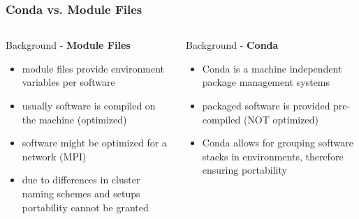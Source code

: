 \begin{frame}
  \frametitle{Conda vs. Module Files}
  \begin{columns}[t]
    \begin{column}{0.5\textwidth}
      Background - \textbf{Module Files}
      \begin{itemize}
       \item module files provide environment variables per software
       \item usually software is compiled on the machine (optimized)
       \item software might be optimized for a network (MPI)
       \item due to differences in cluster naming schemes and setups portability cannot be granted
      \end{itemize}
    \end{column}
    \begin{column}{0.5\textwidth}
      Background - \textbf{Conda}
      \begin{itemize}
       \item Conda is a machine independent package management systems
       \item packaged software is provided pre-compiled (NOT optimized)
       \item Conda allows for grouping software stacks in environments, therefore ensuring portability
      \end{itemize}
    \end{column}
  \end{columns}
\end{frame}

